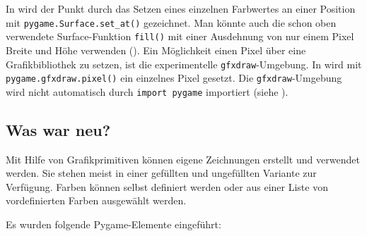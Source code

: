 In  wird der Punkt durch das Setzen eines einzelnen Farbwertes an einer Position mit \texttt{pygame.Surface.set\_at()} gezeichnet. Man könnte auch die schon oben verwendete Surface-Funktion \texttt{fill()} mit einer Ausdehnung von nur einem Pixel Breite und Höhe verwenden (). Ein Möglichkeit einen Pixel über eine Grafikbibliothek zu setzen, ist die experimentelle \texttt{gfxdraw}-Umgebung. In  wird mit \texttt{pygame.gfxdraw.pixel()} ein einzelnes Pixel gesetzt. Die \texttt{gfxdraw}-Umgebung wird nicht automatisch durch \texttt{import pygame} importiert (siehe ).

\subsection*{Was war neu?}

Mit Hilfe von Grafikprimitiven können eigene Zeichnungen erstellt und verwendet werden. Sie stehen meist in einer gefüllten und ungefüllten Variante zur Verfügung. Farben können selbst definiert werden oder aus einer Liste von vordefinierten Farben ausgewählt werden. 

Es wurden folgende Pygame-Elemente eingeführt:

